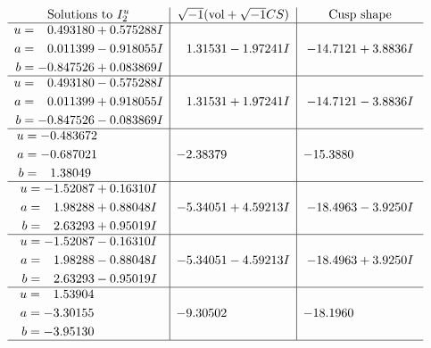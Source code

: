 \documentclass[1p]{elsarticle_modified}
\theoremstyle{definition}
\newcommand{\I}{\sqrt{-1}}
\begin{document}
$$\begin{array}{c|c|c}  
\text{Solutions to }I^u_{2}& \I (\text{vol} + \sqrt{-1}CS) & \text{Cusp shape}\\
 \hline 
\begin{aligned}
u &= \phantom{-}0.493180 + 0.575288 I \\
a &= \phantom{-}0.011399 - 0.918055 I \\
b &= -0.847526 + 0.083869 I\end{aligned}
 & \phantom{-}1.31531 - 1.97241 I & -14.7121 + 3.8836 I \\ \hline\begin{aligned}
u &= \phantom{-}0.493180 - 0.575288 I \\
a &= \phantom{-}0.011399 + 0.918055 I \\
b &= -0.847526 - 0.083869 I\end{aligned}
 & \phantom{-}1.31531 + 1.97241 I & -14.7121 - 3.8836 I \\ \hline\begin{aligned}
u &= -0.483672\phantom{ +0.000000I} \\
a &= -0.687021\phantom{ +0.000000I} \\
b &= \phantom{-}1.38049\phantom{ +0.000000I}\end{aligned}
 & -2.38379\phantom{ +0.000000I} & -15.3880\phantom{ +0.000000I} \\ \hline\begin{aligned}
u &= -1.52087 + 0.16310 I \\
a &= \phantom{-}1.98288 + 0.88048 I \\
b &= \phantom{-}2.63293 + 0.95019 I\end{aligned}
 & -5.34051 + 4.59213 I & -18.4963 - 3.9250 I \\ \hline\begin{aligned}
u &= -1.52087 - 0.16310 I \\
a &= \phantom{-}1.98288 - 0.88048 I \\
b &= \phantom{-}2.63293 - 0.95019 I\end{aligned}
 & -5.34051 - 4.59213 I & -18.4963 + 3.9250 I \\ \hline\begin{aligned}
u &= \phantom{-}1.53904\phantom{ +0.000000I} \\
a &= -3.30155\phantom{ +0.000000I} \\
b &= -3.95130\phantom{ +0.000000I}\end{aligned}
 & -9.30502\phantom{ +0.000000I} & -18.1960\phantom{ +0.000000I}\\
 \hline 
 \end{array}$$\newpage
\end{document}
